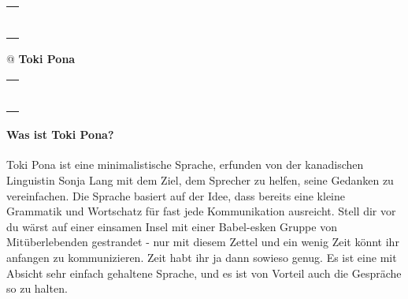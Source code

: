 \documentclass[10pt,a4paper]{article}
\author{Andreas Hemmetter}
\begin{document}
\pagestyle{fancyplain}
\fancyhf{}
\begin{center}

\begin{tabular}[t]{@{}l}
\rule[4pt]{0.35\linewidth}{4pt}
\end{tabular}
\begin{tabular}[t]{@{}}
\fontsize{24pt}{10pt}
\textbf{Toki Pona}
\end{tabular}
\begin{tabular}[t]{r@{}}
\rule[4pt]{0.35\linewidth}{4pt}
\end{tabular}
\end{center}

\paragraph{Was ist Toki Pona?}
Toki Pona ist eine minimalistische Sprache, erfunden von der kanadischen Linguistin Sonja Lang mit dem Ziel, dem Sprecher zu helfen, seine Gedanken zu vereinfachen. Die Sprache basiert auf der Idee, dass bereits eine kleine Grammatik und Wortschatz für fast jede Kommunikation ausreicht. Stell dir vor du wärst auf einer einsamen Insel mit einer Babel-esken Gruppe von Mitüberlebenden gestrandet - nur mit diesem Zettel und ein wenig Zeit könnt ihr anfangen zu kommunizieren. Zeit habt ihr ja dann sowieso genug. Es ist eine mit Absicht sehr einfach gehaltene Sprache, und es ist von Vorteil auch die Gespräche so zu halten.
\end{document}
